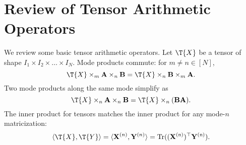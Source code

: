 \section{Review of Tensor Arithmetic Operators}
\label{sec:review_tensor}
We review some basic tensor arithmetic operators.
Let $\T{X}$ be a tensor of shape $I_1\times I_2\times \dots \times I_N$.
Mode products commute: for $m \neq n \in [N]$,
\begin{equation}
\label{eq: tensor_product_mul_exchangable}
\T{X}\times_m \mathbf{A} \times_n \mathbf{B} =    \T{X}\times_n \mathbf{B} \times_m \mathbf{A}.
\end{equation}
Two mode products along the same mode simplify as
\begin{equation}
\label{eq: tensor_product_association}
\T{X}\times_n \mathbf{A} \times_n \mathbf{B} =    \T{X}\times_n (\mathbf{BA}). \nonumber
\end{equation}
The inner product for tensors matches the inner product for any mode-$n$ matricization:
\begin{equation}
\label{eq:F_norm_equivalent}
\langle \T{X}, \T{Y}\rangle = \langle \mathbf{X}^{(n)}, \mathbf{Y}^{(n)}\rangle = \rm{Tr}((\mathbf{X}^{(n)})^\top \mathbf{Y}^{(n)}).
\end{equation}
